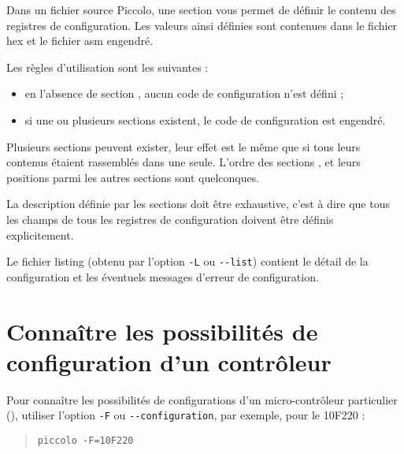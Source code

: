 
\cleardoublepage


\thispagestyle{empty}

Dans un fichier source Piccolo, une section  vous permet de définir le contenu des registres de configuration. Les valeurs ainsi définies sont contenues dans le fichier hex et le fichier asm engendré.


Les règles d'utilisation sont les suivantes :
\begin{itemize}
  \item en l’absence de section , aucun code de configuration n’est défini ;
  \item si une ou plusieurs sections  existent, le code de configuration est engendré.
\end{itemize}

Plusieurs sections  peuvent exister, leur effet est le même que si tous leurs contenus étaient rassemblés dans une seule. L’ordre des sections , et leurs positions parmi les autres sections sont quelconques.

La description définie par les sections  doit être exhaustive, c’est à dire que tous les champs de tous les registres de configuration doivent être définis explicitement.

Le fichier listing (obtenu par l’option \texttt{-L} ou \texttt{-{}-list}) contient le détail de la configuration et les éventuels messages d’erreur de configuration.




\section{Connaître les possibilités de configuration d'un contrôleur}

Pour connaître les possibilités de configurations d’un micro-contrôleur particulier (), utiliser l’option \texttt{-F} ou \texttt{-{}-configuration}, par exemple, pour le 10F220 :
\begin{quote}
\texttt{piccolo -F=10F220}
\end{quote}

